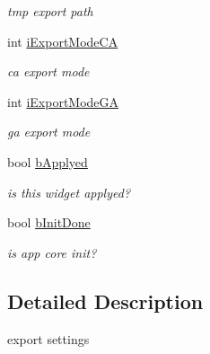 \begin{DoxyCompactItemize}
\begin{DoxyCompactList}\small\item\em tmp export path \item\end{DoxyCompactList}\item 
\hypertarget{classCWidgetExport_a973cbb8a206f868cd28762d5b7038ebb}{
int \hyperlink{classCWidgetExport_a973cbb8a206f868cd28762d5b7038ebb}{iExportModeCA}}
\label{classCWidgetExport_a973cbb8a206f868cd28762d5b7038ebb}

\begin{DoxyCompactList}\small\item\em ca export mode \item\end{DoxyCompactList}\item 
\hypertarget{classCWidgetExport_a6238fd2a78c9c4ea7218ad3720eb497d}{
int \hyperlink{classCWidgetExport_a6238fd2a78c9c4ea7218ad3720eb497d}{iExportModeGA}}
\label{classCWidgetExport_a6238fd2a78c9c4ea7218ad3720eb497d}

\begin{DoxyCompactList}\small\item\em ga export mode \item\end{DoxyCompactList}\item 
\hypertarget{classCWidgetExport_a0d1e850dcb403c2bf07f0b746c144958}{
bool \hyperlink{classCWidgetExport_a0d1e850dcb403c2bf07f0b746c144958}{bApplyed}}
\label{classCWidgetExport_a0d1e850dcb403c2bf07f0b746c144958}

\begin{DoxyCompactList}\small\item\em is this widget applyed? \item\end{DoxyCompactList}\item 
\hypertarget{classCWidgetExport_a1ebdab7de4daa37aa5e69c6c36136046}{
bool \hyperlink{classCWidgetExport_a1ebdab7de4daa37aa5e69c6c36136046}{bInitDone}}
\label{classCWidgetExport_a1ebdab7de4daa37aa5e69c6c36136046}

\begin{DoxyCompactList}\small\item\em is app core init? \item\end{DoxyCompactList}\end{DoxyCompactItemize}


\subsection{Detailed Description}
export settings 

